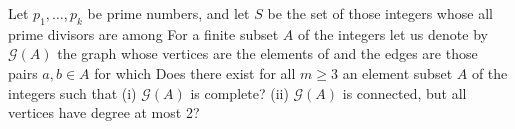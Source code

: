 Let $ p_1,\dots,p_k$ be prime numbers, and let $ S$ be the set of those integers whose all prime divisors are among  For a finite subset $ A$ of the integers let us denote by $ \mathcal G(A)$ the graph whose vertices are the elements of  and the edges are those pairs $ a,b\in A$ for which  Does there exist for all $ m\geq 3$ an element subset $ A$ of the integers such that
(i) $ \mathcal G(A)$ is complete?
(ii) $ \mathcal G(A)$ is connected, but all vertices have degree at most 2?